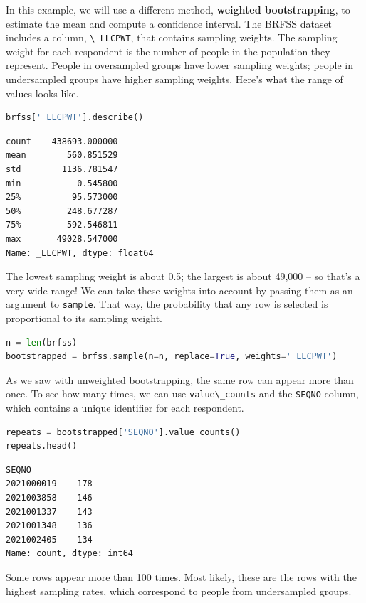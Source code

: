 In this example, we will use a different method, \textbf{weighted
bootstrapping}, to estimate the mean and compute a confidence interval.
The BRFSS dataset includes a column, \passthrough{\lstinline!\_LLCPWT!},
that contains sampling weights. The sampling weight for each respondent
is the number of people in the population they represent. People in
oversampled groups have lower sampling weights; people in undersampled
groups have higher sampling weights. Here's what the range of values
looks like.

\begin{lstlisting}[language=Python,style=source]
brfss['_LLCPWT'].describe()
\end{lstlisting}

\begin{lstlisting}[style=output]
count    438693.000000
mean        560.851529
std        1136.781547
min           0.545800
25%          95.573000
50%         248.677287
75%         592.546811
max       49028.547000
Name: _LLCPWT, dtype: float64
\end{lstlisting}

The lowest sampling weight is about 0.5; the largest is about 49,000 --
so that's a very wide range! We can take these weights into account by
passing them as an argument to \passthrough{\lstinline!sample!}. That
way, the probability that any row is selected is proportional to its
sampling weight.

\begin{lstlisting}[language=Python,style=source]
n = len(brfss)
bootstrapped = brfss.sample(n=n, replace=True, weights='_LLCPWT')
\end{lstlisting}

As we saw with unweighted bootstrapping, the same row can appear more
than once. To see how many times, we can use
\passthrough{\lstinline!value\_counts!} and the
\passthrough{\lstinline!SEQNO!} column, which contains a unique
identifier for each respondent.

\begin{lstlisting}[language=Python,style=source]
repeats = bootstrapped['SEQNO'].value_counts()
repeats.head()
\end{lstlisting}

\begin{lstlisting}[style=output]
SEQNO
2021000019    178
2021003858    146
2021001337    143
2021001348    136
2021002405    134
Name: count, dtype: int64
\end{lstlisting}

Some rows appear more than 100 times. Most likely, these are the rows
with the highest sampling rates, which correspond to people from
undersampled groups.

